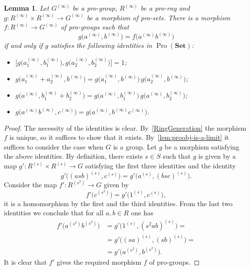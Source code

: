 \documentclass{article}
\newtheorem{lemma}{Lemma} \numberwithin{lemma}{section}
\theoremstyle{definition}
\theoremstyle{remark}
\DeclareMathOperator{\Pro}{Pro}
\newcommand{\Set}{\mathbf{Set}}
\begin{document}
\begin{lemma}\label{RingPresentation}
Let \(G^{(\infty)}\) be a pro-group, $R^{(\infty)}$ be a pro-rng and \(g \colon R^{(\infty)} \times R^{(\infty)} \to G^{(\infty)}\) be a morphism of pro-sets. There is a morphism \(f \colon R^{(\infty)} \to G^{(\infty)}\) of pro-groups such that
\[g\bigl(a^{(\infty)} , b^{(\infty)}\bigr) = f\bigl(a^{(\infty)} b^{(\infty)}\bigr)\]
if and only if \(g\) satisfies the following identities in $\Pro(\Set)$:
\begin{itemize}
\item \(\bigl[g\bigl(a_1^{(\infty)}, b_1^{(\infty)}\bigr), g\bigl(a_2^{(\infty)}, b_2^{(\infty)}\bigr)\bigr] = 1\);
\item \(g\bigl(a_1^{(\infty)} + a_2^{(\infty)}, b^{(\infty)}\bigr) = g\bigl(a_1^{(\infty)}, b^{(\infty)}\bigr)\, g\bigl(a_2^{(\infty)}, b^{(\infty)}\bigr)\);
\item \(g\bigl(a^{(\infty)}, b_1^{(\infty)} + b_2^{(\infty)}\bigr) = g\bigl(a^{(\infty)}, b_1^{(\infty)}\bigr)\, g\bigl(a^{(\infty)}, b_2^{(\infty)}\bigr)\);
\item \(g\bigl(a^{(\infty)} b^{(\infty)}, c^{(\infty)}\bigr) = g\bigl(a^{(\infty)}, b^{(\infty)} c^{(\infty)}\bigr)\).
\end{itemize}
\end{lemma}
\begin{proof}
The necessity of the identities is clear.
By~\cref{RingGeneration} the morphism \(f\) is unique, so it suffices to show that it exists.
By~\cref{lem:proobj-is-a-limit} it suffices to consider the case when \(G\) is a group. 
Let \(g\) be a morphism satisfying the above identities.
By definition, there exists $s\in S$ such that $g$ is given by a map \(g' \colon R^{(s)} \times R^{(s)} \to G\) satisfying the first three identities and the identity 
\[g'\bigl((asb)^{(s)}, c^{(s)}\bigr) = g'\bigl(a^{(s)}, (bsc)^{(s)}\bigr).\]
Consider the map \(f' \colon R^{(s^2)} \to G\) given by
\[f'\bigl(c^{(s^2)}\bigr) = g'\bigl(1^{(s)}, c^{(s)}\bigr),\]
it is a homomorphism by the first and the third identities.
From the last two identities we conclude that for all \(a, b \in R\) one has
\begin{align*}
f'\bigl(a^{(s^2)} b^{(s^2)})
&= g' \bigl( 1^{(s)}, (s^2 ab)^{(s)} \bigr) =\\
&= g' \bigl( (sa)^{(s)}, (sb)^{(s)} \bigr) =\\
&= g' \bigl(a^{(s^2)}, b^{(s^2)}\bigr).
\end{align*}
It is clear that \(f'\) gives the required morphism \(f\) of pro-groups.
\end{proof}
\end{document}
